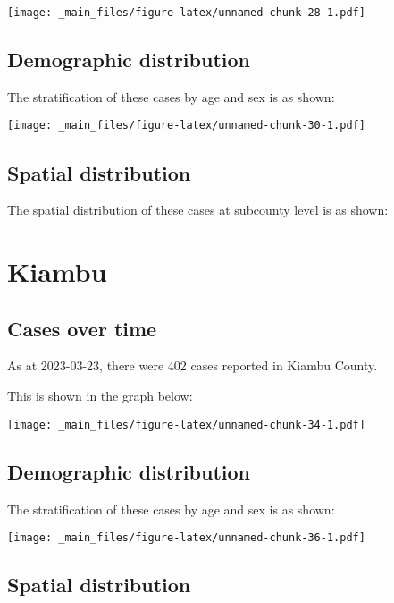 \documentclass[
]{book}
\begin{document}
\texttt{[image: \_main\_files/figure-latex/unnamed-chunk-28-1.pdf]}

\hypertarget{demographic-distribution-4}{%
\section{Demographic distribution}\label{demographic-distribution-4}}

The stratification of these cases by age and sex is as shown:

\texttt{[image: \_main\_files/figure-latex/unnamed-chunk-30-1.pdf]}

\hypertarget{spatial-distribution-4}{%
\section{Spatial distribution}\label{spatial-distribution-4}}

The spatial distribution of these cases at subcounty level is as shown:

\hypertarget{kiambu}{%
\chapter{Kiambu}\label{kiambu}}

\hypertarget{cases-over-time-5}{%
\section{Cases over time}\label{cases-over-time-5}}

As at 2023-03-23, there were 402 cases reported in Kiambu County.

This is shown in the graph below:

\texttt{[image: \_main\_files/figure-latex/unnamed-chunk-34-1.pdf]}

\hypertarget{demographic-distribution-5}{%
\section{Demographic distribution}\label{demographic-distribution-5}}

The stratification of these cases by age and sex is as shown:

\texttt{[image: \_main\_files/figure-latex/unnamed-chunk-36-1.pdf]}

\hypertarget{spatial-distribution-5}{%
\section{Spatial distribution}\label{spatial-distribution-5}}
\end{document}
